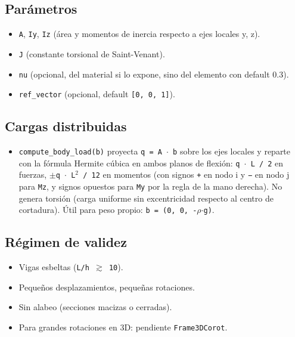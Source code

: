 \documentclass[11pt,letterpaper,oneside]{report}
\begin{document}
\subsection{Parámetros}
\begin{itemize}
  \item \texttt{A}, \texttt{Iy}, \texttt{Iz} (área y momentos de inercia respecto a ejes locales y, z).
  \item \texttt{J} (constante torsional de Saint-Venant).
  \item \texttt{nu} (opcional, del material si lo expone, sino del elemento con default 0.3).
  \item \texttt{ref\_vector} (opcional, default \texttt{[0, 0, 1]}).
\end{itemize}

\subsection{Cargas distribuidas}
\begin{itemize}
  \item \texttt{compute\_body\_load(b)} proyecta \texttt{q = A \ensuremath{\cdot} b} sobre los ejes locales y reparte con la fórmula Hermite cúbica en ambos planos de flexión: \texttt{q \ensuremath{\cdot} L / 2} en fuerzas, \texttt{\ensuremath{\pm}q \ensuremath{\cdot} L\ensuremath{^{2}} / 12} en momentos (con signos \texttt{+} en nodo i y \texttt{−} en nodo j para \texttt{Mz}, y signos opuestos para \texttt{My} por la regla de la mano derecha). No genera torsión (carga uniforme sin excentricidad respecto al centro de cortadura). Útil para peso propio: \texttt{b = (0, 0, -\ensuremath{\rho}\ensuremath{\cdot}g)}.
\end{itemize}

\subsection{Régimen de validez}
\begin{itemize}
  \item Vigas esbeltas (\texttt{L/h \ensuremath{\gtrsim} 10}).
  \item Pequeños desplazamientos, pequeñas rotaciones.
  \item Sin alabeo (secciones macizas o cerradas).
  \item Para grandes rotaciones en 3D: pendiente \texttt{Frame3DCorot}.
\end{itemize}
\end{document}

